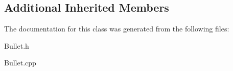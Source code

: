 \subsection*{Additional Inherited Members}


The documentation for this class was generated from the following files\+:\begin{DoxyCompactItemize}
\item 
Bullet.\+h\item 
Bullet.\+cpp\end{DoxyCompactItemize}
